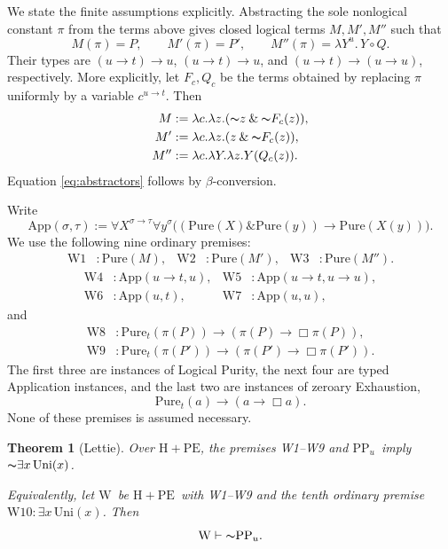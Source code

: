 \documentclass[12pt,leqno]{article}
\newcommand{\AND}{\ensuremath{\mathbin{\&}}}
\newcommand{\IC}{\ensuremath{\rightarrow}}
\newcommand{\NOT}{\ensuremath{\text{$\thicksim$}}}
\newcommand{\dentails}{\ensuremath{\vdash}}
\newcommand{\Pure}{\ensuremath{\mathrm{Pure}}}
\newcommand{\Uni}{\ensuremath{\mathrm{Uni}}}
\newcommand{\PPu}{\ensuremath{\mathrm{PP}_u}}
\newcommand{\HPE}{\ensuremath{\mathrm{H}+\mathrm{PE}}}
\newcommand{\W}{\ensuremath{\mathrm{W}}}
\theoremstyle{plain}
\newtheorem{theorem}{Theorem}
\begin{document}
We state the finite assumptions explicitly. Abstracting the sole
nonlogical constant \(\pi\) from the terms above gives closed logical
terms \(M,M',M''\) such that
\begin{equation}
 M(\pi)=P,\qquad M'(\pi)=P',\qquad
 M''(\pi)=\lambda Y^u.\,Y\circ Q.
 \label{eq:abstractors}
\end{equation}
Their types are \((u\IC t)\IC u\), \((u\IC t)\IC u\), and
\((u\IC t)\IC(u\IC u)\), respectively. More explicitly, let \(F_c,Q_c\)
be the terms obtained by replacing \(\pi\) uniformly by a variable
\(c^{u\IC t}\). Then
\[
 \begin{aligned}
 M&:=\lambda c.\lambda z.(\NOT z\AND\NOT F_c(z)),\\
 M'&:=\lambda c.\lambda z.(z\AND\NOT F_c(z)),\\
 M''&:=\lambda c.\lambda Y.\lambda z.Y(Q_c(z)).
 \end{aligned}
\]
Equation \eqref{eq:abstractors} follows by \(\beta\)-conversion.

Write
\[
 \mathrm{App}(\sigma,\tau):=
 \forall X^{\sigma\IC\tau}\forall y^\sigma
 \bigl((\Pure(X)\AND\Pure(y))\IC\Pure(X(y))\bigr).
\]
We use the following nine ordinary premises:
\begin{align*}
 \mathrm{W1}&:\Pure(M),&
 \mathrm{W2}&:\Pure(M'),&
 \mathrm{W3}&:\Pure(M'').
\end{align*}
\[
 \begin{aligned}
 \mathrm{W4}&:\mathrm{App}(u\IC t,u),&
 \mathrm{W5}&:\mathrm{App}(u\IC t,u\IC u),\\
 \mathrm{W6}&:\mathrm{App}(u,t),&
 \mathrm{W7}&:\mathrm{App}(u,u),
 \end{aligned}
\]
and
\[
 \begin{aligned}
 \mathrm{W8}&:\Pure_t(\pi(P))\IC(\pi(P)\IC\Box\pi(P)),\\
 \mathrm{W9}&:\Pure_t(\pi(P'))\IC(\pi(P')\IC\Box\pi(P')).
 \end{aligned}
\]
The first three are instances of Logical Purity, the next four are
typed Application instances, and the last two are instances of
zeroary Exhaustion,
\[
 \Pure_t(a)\IC(a\IC\Box a).
\]
None of these premises is assumed necessary.

\begin{theorem}[Lettie]\label{thm:main}
Over \HPE, the premises W1--W9 and \PPu\ imply
\(\NOT\exists x\,\Uni(x)\).

Equivalently, let \W\ be \HPE\ with W1--W9 and the tenth ordinary premise
\(\mathrm{W10}:\exists x\,\Uni(x)\). Then
\[
 \W\dentails\NOT\PPu.
\]
\end{theorem}
\end{document}
